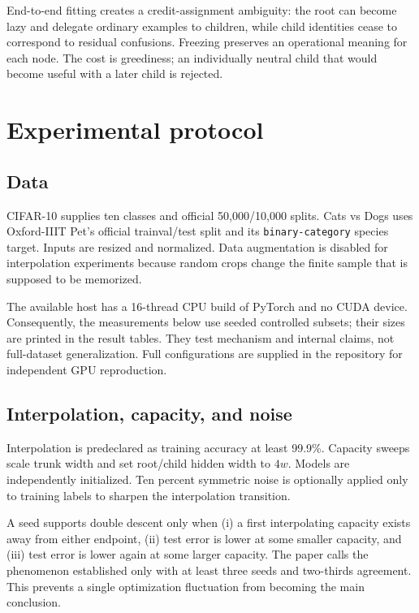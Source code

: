 \documentclass[11pt,a4paper]{article}
\begin{document}
End-to-end fitting creates a credit-assignment ambiguity: the root can become
lazy and delegate ordinary examples to children, while child identities cease
to correspond to residual confusions. Freezing preserves an operational
meaning for each node. The cost is greediness; an individually neutral child
that would become useful with a later child is rejected.

\section{Experimental protocol}

\subsection{Data}

CIFAR-10 supplies ten classes and official 50,000/10,000 splits. Cats vs Dogs
uses Oxford-IIIT Pet's official trainval/test split and its
\texttt{binary-category} species target. Inputs are resized and normalized.
Data augmentation is disabled for interpolation experiments because random
crops change the finite sample that is supposed to be memorized.

The available host has a 16-thread CPU build of PyTorch and no CUDA device.
Consequently, the measurements below use seeded controlled subsets; their
sizes are printed in the result tables. They test mechanism and internal
claims, not full-dataset generalization. Full configurations are supplied in
the repository for independent GPU reproduction.

\subsection{Interpolation, capacity, and noise}

Interpolation is predeclared as training accuracy at least 99.9\%. Capacity
sweeps scale trunk width and set root/child hidden width to \(4w\). Models are
independently initialized. Ten percent symmetric noise is optionally applied
only to training labels to sharpen the interpolation transition.

A seed supports double descent only when (i) a first interpolating capacity
exists away from either endpoint, (ii) test error is lower at some smaller
capacity, and (iii) test error is lower again at some larger capacity. The
paper calls the phenomenon established only with at least three seeds and
two-thirds agreement. This prevents a single optimization fluctuation from
becoming the main conclusion.
\end{document}
